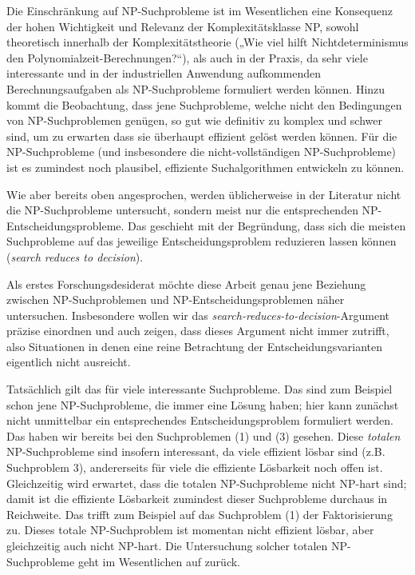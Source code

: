 Die Einschränkung auf NP-Suchprobleme ist im Wesentlichen eine Konsequenz der hohen Wichtigkeit und Relevanz der Komplexitätsklasse NP, sowohl theoretisch innerhalb der Komplexitätstheorie („Wie viel hilft Nichtdeterminismus den Polynomialzeit-Berechnungen?“), als auch in der Praxis, da sehr viele interessante und in der industriellen Anwendung aufkommenden Berechnungsaufgaben als  NP-Suchprobleme formuliert werden können. Hinzu kommt die Beobachtung, dass jene Suchprobleme, welche nicht den Bedingungen von NP-Suchproblemen genügen, so gut wie definitiv zu komplex und schwer sind, um zu erwarten dass sie überhaupt effizient gelöst werden können. Für die NP-Suchprobleme (und insbesondere die nicht-vollständigen NP-Suchprobleme) ist es zumindest noch plausibel, effiziente Suchalgorithmen entwickeln zu können.

Wie aber bereits oben angesprochen, werden üblicherweise in der Literatur nicht die NP-Suchprobleme untersucht, sondern meist nur die entsprechenden NP-Entscheidungsprobleme. Das geschieht mit der Begründung, dass sich die meisten Suchprobleme auf das jeweilige Entscheidungsproblem reduzieren lassen können (\emph{search reduces to decision}). 

Als erstes Forschungsdesiderat möchte diese Arbeit genau jene Beziehung zwischen NP-Suchproblemen und NP-Entscheidungsproblemen näher untersuchen. 
Insbesondere wollen wir das \emph{search-reduces-to-decision}-Argument präzise einordnen und auch zeigen, dass dieses Argument nicht immer zutrifft, also Situationen in denen eine reine Betrachtung der Entscheidungsvarianten eigentlich nicht ausreicht. 

Tatsächlich gilt das für viele interessante Suchprobleme. Das sind zum Beispiel schon jene NP-Suchprobleme, die immer eine Lösung haben; hier kann zunächst nicht unmittelbar ein entsprechendes Entscheidungsproblem formuliert werden.
Das haben wir bereits bei den Suchproblemen (1) und (3) gesehen.
Diese \emph{totalen} NP-Suchprobleme sind insofern interessant, da viele effizient lösbar sind (z.B. Suchproblem 3), andererseits für viele die effiziente Lösbarkeit noch offen ist. Gleichzeitig wird erwartet, dass die totalen NP-Suchprobleme nicht NP-hart sind; damit ist die effiziente Lösbarkeit zumindest dieser Suchprobleme durchaus in Reichweite. 
Das trifft zum Beispiel auf das Suchproblem (1) der Faktorisierung zu. Dieses totale NP-Suchproblem ist momentan nicht effizient lösbar, aber gleichzeitig auch nicht NP-hart. Die Untersuchung solcher totalen NP-Suchprobleme geht im Wesentlichen auf \textcites{johnson_how_1988}{megiddo_total_1991} zurück.

